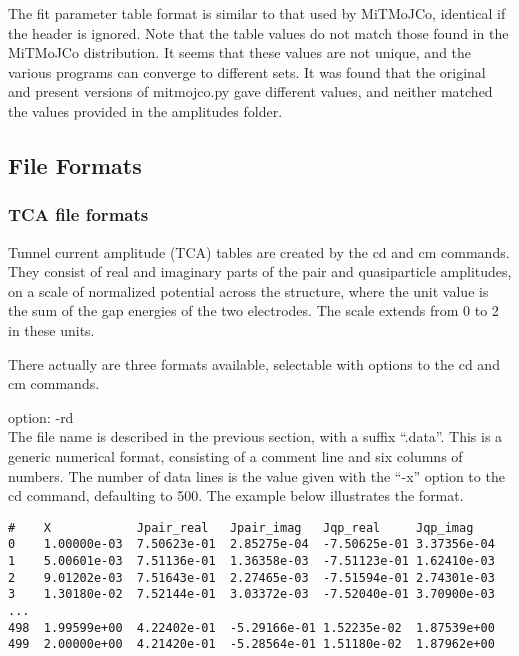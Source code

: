 {The fit parameter table format is similar to that used by MiTMoJCo,
identical if the header is ignored.  Note that the table values do not
match those found in the MiTMoJCo distribution.  It seems that these
values are not unique, and the various programs can converge to
different sets.  It was found that the original and present versions
of {\vt mitmojco.py} gave different values, and neither matched the
values provided in the amplitudes folder.

\subsection{File Formats}


\subsubsection{TCA file formats}

Tunnel current amplitude (TCA) tables are created by the {\vt cd} and
{\vt cm} commands.  They consist of real and imaginary parts of the
pair and quasiparticle amplitudes, on a scale of normalized potential
across the structure, where the unit value is the sum of the gap
energies of the two electrodes.  The scale extends from 0 to 2 in
these units.

There actually are three formats available, selectable with options to
the {\vt cd} and {\vt cm} commands.

\begin{description}
\item{option: {\vt -rd}}\\
The file name is described in the previous section, with a suffix
``{\vt .data}''.  This is a generic numerical format, consisting of a
comment line and six columns of numbers.  The number of data lines is
the value given with the ``{\vt -x}'' option to the {\vt cd} command,
defaulting to 500.  The example below illustrates the format.
\end{description}

\begin{verbatim}
#    X            Jpair_real   Jpair_imag   Jqp_real     Jqp_imag
0    1.00000e-03  7.50623e-01  2.85275e-04  -7.50625e-01 3.37356e-04
1    5.00601e-03  7.51136e-01  1.36358e-03  -7.51123e-01 1.62410e-03
2    9.01202e-03  7.51643e-01  2.27465e-03  -7.51594e-01 2.74301e-03
3    1.30180e-02  7.52144e-01  3.03372e-03  -7.52040e-01 3.70900e-03
...
498  1.99599e+00  4.22402e-01  -5.29166e-01 1.52235e-02  1.87539e+00
499  2.00000e+00  4.21420e-01  -5.28564e-01 1.51180e-02  1.87962e+00
\end{verbatim}

}
